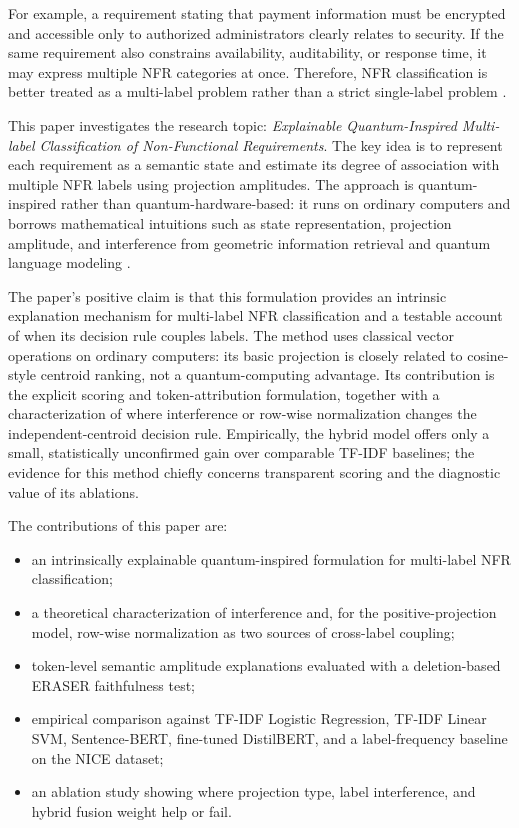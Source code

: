 \documentclass[runningheads]{llncs}
\begin{document}
For example, a requirement stating that payment information must be encrypted
and accessible only to authorized administrators clearly relates to security. If
the same requirement also constrains availability, auditability, or response
time, it may express multiple NFR categories at once. Therefore, NFR
classification is better treated as a multi-label problem rather than a strict
single-label problem \cite{tsoumakas2007multilabel,zhang2014review}.

This paper investigates the research topic: \emph{Explainable Quantum-Inspired
Multi-label Classification of Non-Functional Requirements}. The key idea is to
represent each requirement as a semantic state and estimate its degree of
association with multiple NFR labels using projection amplitudes. The approach
is quantum-inspired rather than quantum-hardware-based: it runs on ordinary
computers and borrows mathematical intuitions such as state representation,
projection amplitude, and interference from geometric information retrieval and
quantum language modeling \cite{vanrijsbergen2004geometry,sordoni2013quantum,li2019cnm}.

The paper's positive claim is that this formulation provides an intrinsic
explanation mechanism for multi-label NFR classification and a testable
account of when its decision rule couples labels. The method uses classical
vector operations on ordinary computers: its basic projection is closely
related to cosine-style centroid ranking, not a quantum-computing advantage.
Its contribution is the explicit scoring and token-attribution formulation,
together with a characterization of where interference or row-wise
normalization changes the independent-centroid decision rule. Empirically,
the hybrid model offers only a small, statistically unconfirmed gain over
comparable TF-IDF baselines; the evidence for this method chiefly concerns
transparent scoring and the diagnostic value of its ablations.

The contributions of this paper are:
\begin{itemize}
    \item an intrinsically explainable quantum-inspired formulation for multi-label NFR classification;
    \item a theoretical characterization of interference and, for the positive-projection model, row-wise normalization as two sources of cross-label coupling;
    \item token-level semantic amplitude explanations evaluated with a deletion-based ERASER faithfulness test;
    \item empirical comparison against TF-IDF Logistic Regression, TF-IDF Linear SVM, Sentence-BERT, fine-tuned DistilBERT, and a label-frequency baseline on the NICE dataset;
    \item an ablation study showing where projection type, label interference, and hybrid fusion weight help or fail.
\end{itemize}
\end{document}
